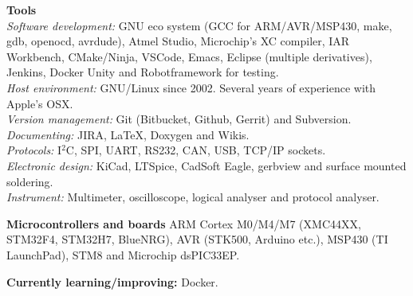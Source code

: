 \documentclass[a4paper,margin,line]{res} \usepackage{latexsym}
\begin{document}
\begin{resume}
{\bf Tools}\\ {\em Software development:} GNU eco system (GCC for
ARM/AVR/MSP430, make, gdb, openocd, avrdude), Atmel Studio,
Microchip's XC compiler, IAR Workbench, CMake/Ninja, VSCode, Emacs, Eclipse
(multiple derivatives), Jenkins, Docker Unity and Robotframework for testing.
\\ {\em Host environment:} GNU/Linux since 2002. Several years of
experience with Apple's OSX.\\ {\em Version management:} Git
(Bitbucket, Github, Gerrit) and Subversion. \\ {\em Documenting:}
JIRA, \LaTeX, Doxygen and Wikis. \\ {\em Protocols:} I$^2$C, SPI,
UART, RS232, CAN, USB, TCP/IP sockets.\\ {\em Electronic design:}
KiCad, LTSpice, CadSoft Eagle, gerbview and surface mounted
soldering. \\ {\em Instrument:} Multimeter, oscilloscope, logical
analyser and protocol analyser.


{\bf Microcontrollers and boards} ARM Cortex M0/M4/M7 (XMC44XX, STM32F4, 
STM32H7, Blue\-NRG), AVR (STK500, Arduino etc.), MSP430 (TI
LaunchPad), STM8 and Microchip dsPIC33EP.

{\bf Currently learning/improving:} Docker.






\end{resume}
\end{document}
